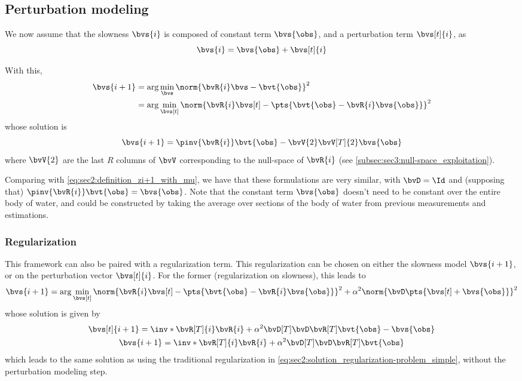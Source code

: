 {\subsection{Perturbation modeling}

We now assume that the slowness $\bvs{i}$ is composed of constant term $\bvs{\obs}$, and a perturbation term $\bvs[t]{i}$, as
\begin{equation}
	\bvs{i} = \bvs{\obs} + \bvs[t]{i}
\end{equation}

With this,
\begin{equation}
	\begin{split}
		\bvs{i+1}
		& = \arg \min_{\bvs} \norm{\bvR{i} \bvs - \bvt{\obs}}^2 \\
		& = \arg \min_{\bvs[t]} \norm{\bvR{i} \bvs[t] - \pts{\bvt{\obs} - \bvR{i}\bvs{\obs}}}^2
	\end{split}
\end{equation}
whose solution is
\begin{equation}
	\bvs{i+1} =  \pinv{\bvR{i}} \bvt{\obs} - \bvV{2}\bvV[T]{2} \bvs{\obs}
	\label{eq:sec4:bvz_perturbation_model}
\end{equation}
where $\bvV{2}$ are the last $R$ columns of $\bvV$ corresponding to the null-space of $\bvR{i}$ (see \cref{subsec:sec3:null-space_exploitation}).

Comparing with \cref{eq:sec2:definition_zi+1_with_mu}, we have that these formulations are very similar, with $\bvD = \Id$ and (supposing that) $\pinv{\bvR{i}} \bvt{\obs} = \bvs{\obs}$. Note that the constant term $\bvs{\obs}$ doesn't need to be constant over the entire body of water, and could be constructed by taking the average over sections of the body of water from previous measurements and estimations.

\subsubsection{Regularization}

This framework can also be paired with a regularization term. This regularization can be chosen on either the slowness model $\bvs{i+1}$, or on the perturbation vector $\bvs[t]{i}$. For the former (regularization on slowness), this leads to
\begin{equation}
	\bvs{i+1} = \arg\min_{\bvs[t]} \norm{\bvR{i} \bvs[t] - \pts{\bvt{\obs} - \bvR{i} \bvs{\obs}}}^2 + \alpha^2\norm{\bvD \pts{\bvs[t] + \bvs{\obs}}}^2 
\end{equation}
whose solution is given by
\begin{subequations}
	\begin{gather}
		\bvs[t]{i+1} = \inv*{\bvR[T]{i} \bvR{i} + \alpha^2 \bvD[T] \bvD} \bvR[T] \bvt{\obs} - \bvs{\obs} \\
		\bvs{i+1} = \inv*{\bvR[T]{i} \bvR{i} + \alpha^2 \bvD[T] \bvD} \bvR[T] \bvt{\obs}
	\end{gather}
\end{subequations}
which leads to the same solution as using the traditional regularization in \cref{eq:sec2:solution_regularization-problem_simple}, without the perturbation modeling step.

}
